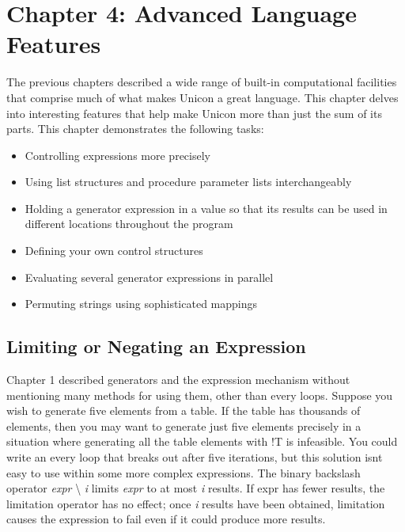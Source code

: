 \clearpage\section{Chapter 4: Advanced Language Features}

The previous chapters described a wide range of built-in computational
facilities that comprise much of what makes Unicon a great language.
This chapter delves into interesting features that help make Unicon
more than just the sum of its parts. This chapter demonstrates the
following tasks:

\begin{itemize}
\item Controlling expressions more precisely
\item Using list structures and procedure parameter lists
interchangeably
\item Holding a generator expression in a value so that
its results can be used in different locations throughout the program
\item Defining your own control structures
\item Evaluating several generator expressions in parallel
\item Permuting strings using sophisticated mappings
\end{itemize}
\subsection[Limiting or Negating an Expression]{Limiting or Negating an
Expression}
Chapter 1 described generators and the
expression mechanism without mentioning many methods for using them,
other than \textsf{every} loops. Suppose you wish to generate five
elements from a table. If the table has thousands of elements, then you
may want to generate just five elements precisely in a situation where
generating all the table elements with \textsf{!T} is infeasible. You
could write an \textsf{every} loop that breaks out after five
iterations, but this solution isn{\textquotesingle}t easy to use within
some more complex expressions. The binary backslash operator
\textsf{\textit{expr}}\textsf{ {\textbackslash} }\textsf{\textit{i}}
limits \textsf{\textit{expr}} to at most \textsf{\textit{i}} results.
If \textsf{expr} has fewer results, the limitation operator has no
effect; once \textsf{\textit{i}} results have been obtained, limitation
causes the expression to fail even if it
could produce more results.

